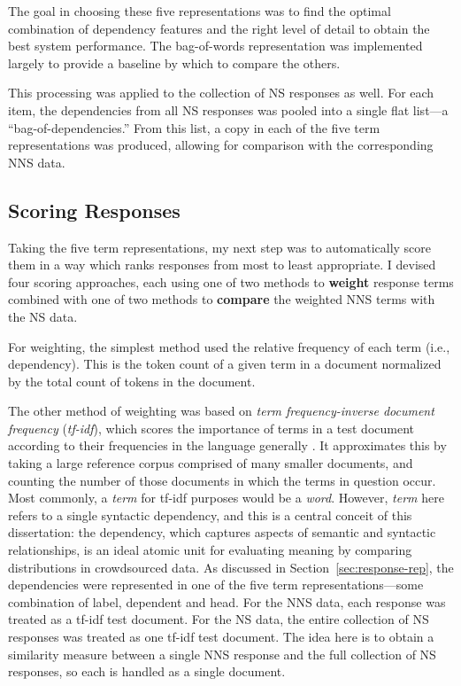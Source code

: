 The goal in choosing these five representations was to find the optimal combination of dependency features and the right level of detail to obtain the best system performance. The bag-of-words representation was implemented largely to provide a baseline by which to compare the others.

This processing was applied to the collection of NS responses as well. For each item, the dependencies from all NS responses was pooled into a single flat list---a ``bag-of-dependencies.'' From this list, a copy in each of the five term representations was produced, allowing for comparison with the corresponding NNS data.


\subsection{Scoring Responses}
\label{sec:scoring}

Taking the five term representations, my next step was to automatically score them in a way which ranks responses from most to least appropriate.  I devised four scoring approaches, each using one of two methods to \textbf{weight} response terms combined with one of two methods to \textbf{compare} the weighted NNS terms with the NS data.

For weighting, the simplest method used the relative frequency of each term (i.e., dependency). This is the token count of a given term in a document normalized by the total count of tokens in the document.

The other method of weighting was based on \textit{term frequency-inverse document frequency} (\textit{tf-idf}), which scores the importance of terms in a test document according to their frequencies in the language generally \citep[][ch. 6]{manning-et-al:08}. It approximates this by taking a large reference corpus comprised of many smaller documents, and counting the number of those documents in which the terms in question occur. Most commonly, a \textit{term} for tf-idf purposes would be a \textit{word}. However, \textit{term} here refers to a single syntactic dependency, and this is a central conceit of this dissertation:  the dependency, which captures aspects of semantic and syntactic relationships, is an ideal atomic unit for evaluating meaning by comparing distributions in crowdsourced data. As discussed in Section~\ref{sec:response-rep}, the dependencies were represented in one of the five term representations---some combination of label, dependent and head. For the NNS data, each response was treated as a tf-idf test document. For the NS data, the entire collection of NS responses was treated as one tf-idf test document. The idea here is to obtain a similarity measure between a single NNS response and the full collection of NS responses, so each is handled as a single document.

